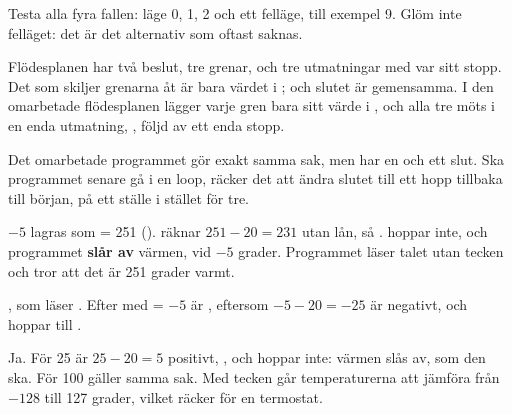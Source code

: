 Testa alla fyra fallen: läge 0, 1, 2 och ett felläge, till exempel 9. Glöm inte felläget: det
är det alternativ som oftast saknas.

Flödesplanen har två beslut, tre grenar, och tre utmatningar med var sitt stopp. Det som skiljer
grenarna åt är bara värdet i ;  och slutet är gemensamma. I den omarbetade
flödesplanen lägger varje gren bara sitt värde i , och alla tre möts i en enda utmatning,
, följd av ett enda stopp.

Det omarbetade programmet gör exakt samma sak, men har en  och ett slut. Ska programmet
senare gå i en loop, räcker det att ändra slutet till ett hopp tillbaka till början, på ett ställe i
stället för tre.

$-5$ lagras som  = 251 ().  räknar
$251 - 20 = 231$ utan lån, så .  hoppar inte, och programmet \textbf{slår av}
värmen, vid $-5$ grader. Programmet läser talet utan tecken och tror att det är 251 grader varmt.

, som läser . Efter  med  = $-5$ är
, eftersom $-5 - 20 = -25$ är negativt, och  hoppar till .

Ja. För 25 är $25 - 20 = 5$ positivt, , och  hoppar inte: värmen slås
av, som den ska. För 100 gäller samma sak. Med tecken går temperaturerna att jämföra från $-128$
till 127 grader, vilket räcker för en termostat.
